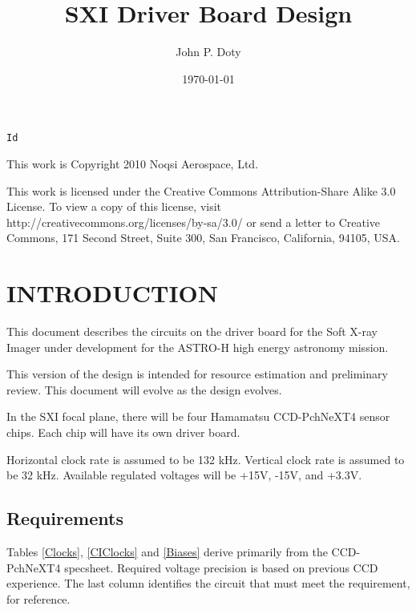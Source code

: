 \documentclass[a4paper,12pt]{article}
\author{John P. Doty}
\date{\today}
\title{SXI Driver Board Design}
\begin{document}
\begin{titlepage}
\maketitle
\centering
\verb$Id$
\vspace{5cm}

This work is Copyright 2010 Noqsi Aerospace, Ltd.

This work is licensed under the Creative Commons Attribution-Share Alike 3.0 License. To view a copy of this license, visit http://creativecommons.org/licenses/by-sa/3.0/ or send a letter to Creative Commons, 171 Second Street, Suite 300, San Francisco, California, 94105, USA.

\end{titlepage} 

\section{INTRODUCTION}
This document describes the circuits on the driver board for the Soft X-ray Imager under development for the ASTRO-H high energy astronomy mission.

This version of the design is intended for resource estimation and preliminary review. This document will evolve as the design evolves.

In the SXI focal plane, there will be four Hamamatsu CCD-PchNeXT4 sensor chips. Each chip will have its own driver board. 

Horizontal clock rate is assumed to be 132 kHz. Vertical clock rate is assumed to be 32 kHz. Available regulated voltages will be +15V, -15V, and +3.3V. 


\subsection{Requirements}
Tables \ref{Clocks}, \ref{CIClocks} and \ref{Biases} derive primarily from the CCD-PchNeXT4 specsheet. Required voltage precision is based on previous CCD experience. The last column identifies the circuit that must meet the requirement, for reference.
\end{document}
